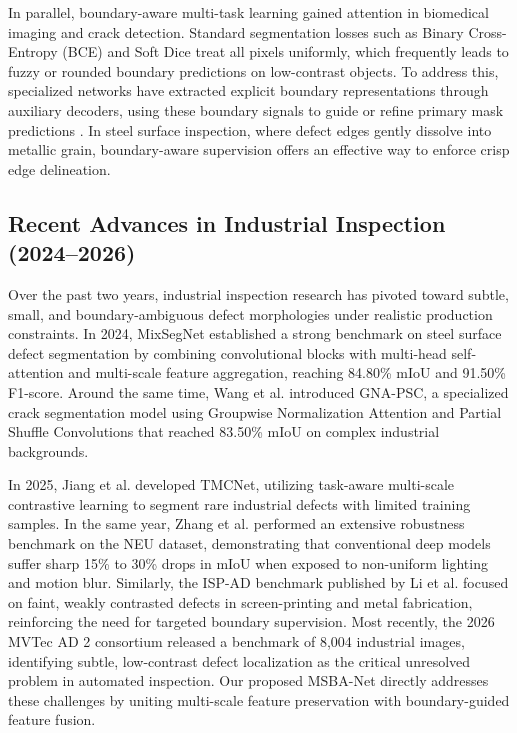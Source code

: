 \documentclass[10pt,a4paper]{article}
\begin{document}
In parallel, boundary-aware multi-task learning gained attention in biomedical imaging and crack detection. Standard segmentation losses such as Binary Cross-Entropy (BCE) and Soft Dice treat all pixels uniformly, which frequently leads to fuzzy or rounded boundary predictions on low-contrast objects. To address this, specialized networks have extracted explicit boundary representations through auxiliary decoders, using these boundary signals to guide or refine primary mask predictions \cite{gnapsc2024, ispad2025}. In steel surface inspection, where defect edges gently dissolve into metallic grain, boundary-aware supervision offers an effective way to enforce crisp edge delineation.

\subsection{Recent Advances in Industrial Inspection (2024--2026)}
Over the past two years, industrial inspection research has pivoted toward subtle, small, and boundary-ambiguous defect morphologies under realistic production constraints. In 2024, MixSegNet \cite{mixsegnet2024} established a strong benchmark on steel surface defect segmentation by combining convolutional blocks with multi-head self-attention and multi-scale feature aggregation, reaching 84.80\% mIoU and 91.50\% F1-score. Around the same time, Wang et al. \cite{gnapsc2024} introduced GNA-PSC, a specialized crack segmentation model using Groupwise Normalization Attention and Partial Shuffle Convolutions that reached 83.50\% mIoU on complex industrial backgrounds.

In 2025, Jiang et al. \cite{tmcnet2025} developed TMCNet, utilizing task-aware multi-scale contrastive learning to segment rare industrial defects with limited training samples. In the same year, Zhang et al. \cite{neu_robustness2025} performed an extensive robustness benchmark on the NEU dataset, demonstrating that conventional deep models suffer sharp 15\% to 30\% drops in mIoU when exposed to non-uniform lighting and motion blur. Similarly, the ISP-AD benchmark published by Li et al. \cite{ispad2025} focused on faint, weakly contrasted defects in screen-printing and metal fabrication, reinforcing the need for targeted boundary supervision. Most recently, the 2026 MVTec AD 2 consortium \cite{mvtecad2_2026} released a benchmark of 8,004 industrial images, identifying subtle, low-contrast defect localization as the critical unresolved problem in automated inspection. Our proposed MSBA-Net directly addresses these challenges by uniting multi-scale feature preservation with boundary-guided feature fusion.
\end{document}
